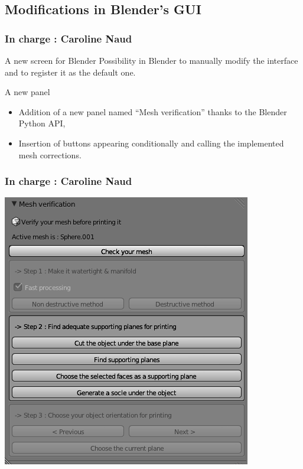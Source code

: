 \documentclass{beamer}
\begin{document}
\subsection{Modifications in Blender's GUI}
\begin{frame}
	\frametitle{In charge : Caroline Naud}

    \begin{block}{A new screen for Blender}
Possibility in Blender to manually modify the interface and to register it as the default one.
    \end{block}
    
    \begin{block}{A new panel}
    \begin{itemize}
	\item Addition of a new panel named “Mesh verification” thanks to the Blender Python API,
	\item Insertion of buttons appearing conditionally and calling the implemented mesh corrections.
	\end{itemize}
    \end{block}
\end{frame}

\begin{frame}
	\frametitle{In charge : Caroline Naud}
    \begin{center}
		\includegraphics[height=.8\textheight]{Panel}
	\end{center}
\end{frame}
\end{document}

